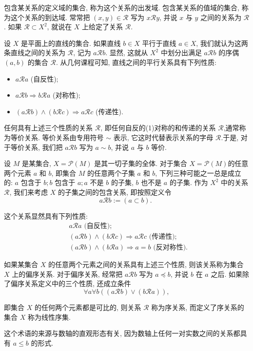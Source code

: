 \documentclass{ctexart}
\begin{document}
包含某关系的定义域的集合, 称为这个关系的出发域. 包含某关系的值域的集合, 称为这个关系的到达域.
常常把 $(x, y) \in \mathcal{R}$ 写为 $x \mathcal{R} y$, 并说 $x$ 与 $y$ 之间的关系为 $\mathcal{R}$.
如果 $\mathcal{R} \subset X^2$, 就说在 $X$ 上给定了关系 $\mathcal{R}$.

\begin{example}
    设 $X$ 是平面上的直线的集合. 如果直线 $b \in X$ 平行于直线 $a \in X$, 我们就认为这两条直线之间的关系为 $\mathcal{R}$, 记为 $a \mathcal{R} b$. 显然, 这就从 $X^2$ 中划分出满足 $a \mathcal{R} b$ 的序偶 $(a, b)$ 的集合 $\mathcal{R}$. 从几何课程可知, 直线之间的平行关系具有下列性质:

\begin{itemize}
    \item $a \mathcal{R} a$ (自反性);
    \item $a \mathcal{R} b \Rightarrow b \mathcal{R} a$ (对称性);
    \item $(a \mathcal{R} b) \wedge(b \mathcal{R} c) \Rightarrow a \mathcal{R} c$ (传递性).
\end{itemize}

任何具有上述三个性质的关系 $\mathcal{R}$, 即任何自反的(1)对称的和传递的关系 $\mathcal{R}$,通常称为等价关系. 等价关系由专用符号 $\sim$ 表示, 它这时代替表示关系的字母 $\mathcal{R}$.于是, 对于等价关系, 我们把 $a \mathcal{R} b$ 写为 $a \sim b$, 并说 $a$ 与 $b$ 等价.
    
\end{example}

\begin{example}
    设 $M$ 是某集合, $X=\mathcal{P}(M)$ 是其一切子集的全体. 对于集合 $X=\mathcal{P}(M)$的任意两个元素 $a$ 和 $b$, 即集合 $M$ 的任意两个子集 $a$ 和 $b$, 下列三种可能之一总是成立的: $a$ 包含于 $b ; b$ 包含于 $a ; a$ 不是 $b$ 的子集, $b$ 也不是 $a$ 的子集.
作为 $X^2$ 中的关系 $\mathcal{R}$, 我们来考虑 $X$ 的子集之间的包含关系, 即按照定义令
$$
a \mathcal{R} b:=(a \subset b) \text {. }
$$

这个关系显然具有下列性质:
$$
\begin{aligned}
& a \mathcal{R} a \text { (自反性); } \\
& (a \mathcal{R} b) \wedge(b \mathcal{R} c) \Rightarrow a \mathcal{R} c \text { (传递性); } \\
& (a \mathcal{R} b) \wedge(b \mathcal{R} a) \Rightarrow a=b \text { (反对称性). }
\end{aligned}
$$

如果某集合 $X$ 的任意两个元素之间的关系具有上述三个性质, 则该关系称为集合 $X$ 上的偏序关系. 对于偏序关系, 经常把 $a \mathcal{R} b$ 写为 $a \preccurlyeq b$, 并说 $b$ 在 $a$ 之后.
如果除了偏序关系定义中的三个性质, 还成立条件
$$
\forall a \forall b((a \mathcal{R} b) \vee(b \mathcal{R} a)),
$$

即集合 $X$ 的任何两个元素都是可比的, 则关系 $\mathcal{R}$ 称为序关系, 而定义了序关系的集合 $X$ 称为线性序集.

这个术语的来源与数轴的直观形态有关, 因为数轴上任何一对实数之间的关系都具有 $a \leqslant b$ 的形式.
    
\end{example}
\end{document}
